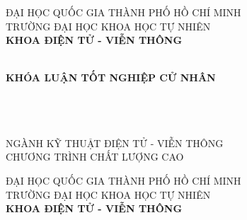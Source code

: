 \hypersetup{pageanchor=false}
\begin{titlepage}

\begin{center}
ĐẠI HỌC QUỐC GIA THÀNH PHỐ HỒ CHÍ MINH\\
TRƯỜNG ĐẠI HỌC KHOA HỌC TỰ NHIÊN\\
\textbf{KHOA ĐIỆN TỬ - VIỄN THÔNG}\\[2cm]


{ \Large \bfseries {} \\[2cm] } 

{ \Large \bfseries \textbf{KHÓA LUẬN TỐT NGHIỆP CỬ NHÂN} \\[3cm]} 


\large \tenKL \\ 
\large \text{} \\ 
\large \text{} \\
\large NGÀNH KỸ THUẬT ĐIỆN TỬ - VIỄN THÔNG\\
\large CHƯƠNG TRÌNH CHẤT LƯỢNG CAO\\


\vfill
{}

\end{center}

\pagebreak

\myemptypage

\begin{center}
ĐẠI HỌC QUỐC GIA THÀNH PHỐ HỒ CHÍ MINH\\
TRƯỜNG ĐẠI HỌC KHOA HỌC TỰ NHIÊN\\
\textbf{KHOA ĐIỆN TỬ - VIỄN THÔNG}\\[2cm]



\end{center}
\end{titlepage}
